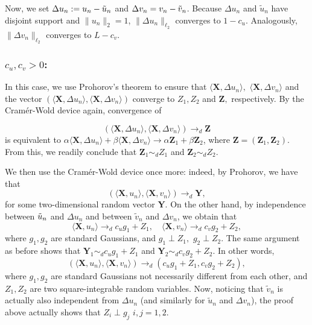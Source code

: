 \documentclass[a4paper,12pt]{amsart}
\numberwithin{equation}{section}
\newcommand{\X}{\mathbf X}
\begin{document}
Now, we set $\Delta u_n:= u_n-\Tilde{u}_n$ and $\Delta v_n = v_n-\Tilde{v}_n $. Because $\Delta u_n$ and $\tilde{u}_n$ have disjoint support and $\|u_n\|_2 = 1$, $\|\Delta u_n\|_{\ell_2}$ converges to $1-c_u$. Analogously, $\|\Delta v_n\|_{\ell_2}$ converges to $L-c_v$.

\medskip

\subsubsection{\textbf{$c_u,c_v>0$:}} In this case, we use Prohorov's theorem to ensure that $\langle \X, \Delta u_n \rangle , \,\, \langle \X, \Delta v_n \rangle$ and the vector $(\langle \X , \Delta u_n \rangle, \langle \X, \Delta v_n\rangle)$ converge to $Z_1,Z_2$ and $\mathbf{Z},$ respectively. By the Cram\'er-Wold device again, convergence of 

$$(\langle \X , \Delta u_n \rangle, \langle \X, \Delta v_n\rangle) \rightarrow_{d} \mathbf{Z}$$
 is equivalent to $\alpha \langle \X , \Delta u_n \rangle + \beta \langle \X, \Delta v_n \rangle \to \alpha \mathbf{Z}_1 + \beta \mathbf{Z}_2$, where $\mathbf{Z} = (\mathbf{Z}_1, \mathbf{Z}_2).$ From this, we readily conclude that $\mathbf{Z}_1 \sim_d Z_1$ and $\mathbf{Z}_2 \sim_d Z_2$. 

We then use the Cram\'er-Wold device once more: indeed, by Prohorov, we have that  
$$
\left(\langle \X, u_n\rangle, \langle \X, v_n\rangle \right) \rightarrow_{d} \mathbf{Y},
$$
for some two-dimensional random vector $\mathbf{Y}$. On the other hand, by independence between $\Tilde{u}_n$ and $\Delta u_n$ and between $\tilde{v}_n$ and $\Delta v_n$, we obtain that 
\[
\langle \X,u_n \rangle \to_d c_u g_1 + Z_1, \quad \langle \X, v_n \rangle \to_d c_v g_2 + Z_2,
\]
where $g_1,g_2$ are standard Gaussians, and $g_1 \perp Z_1, \, \, g_2 \perp Z_2$. The same argument as before shows that $\mathbf{Y}_1 \sim_d c_u g_1 + Z_1$ and $\mathbf{Y}_2 \sim_d c_v g_2 + Z_2.$ In other words, 
\begin{equation*}
\left(\langle \X, u_n\rangle, \langle \X, v_n\rangle \right) \rightarrow_{d} (c_ug_1 + Z_1, c_v g_2 + Z_2),
\end{equation*}
where $g_1,g_2$ are standard Gaussians not necessarily different from each other, and $Z_1,Z_2$ are two square-integrable random variables. Now, noticing that $\tilde{v}_n$ is actually also independent from $\Delta u_n$ (and similarly for $\tilde{u}_n$ and $\Delta v_n$), the proof above actually shows that $Z_i \perp g_j \, \, i,j=1,2$.  
\end{document}
